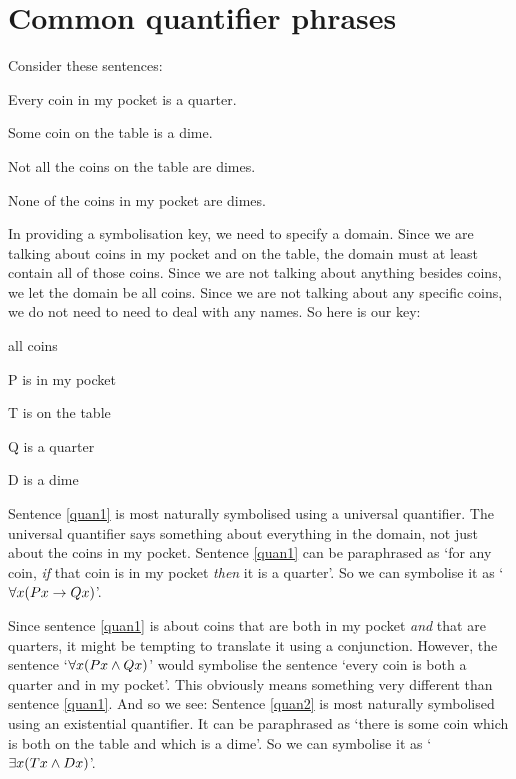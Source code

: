 \section{Common quantifier phrases}
Consider these sentences:
	\begin{earg}
		\item[\ex{quan1}] Every coin in my pocket is a quarter.
		\item[\ex{quan2}] Some coin on the table is a dime.
		\item[\ex{quan3}] Not all the coins on the table are dimes.
		\item[\ex{quan4}] None of the coins in my pocket are dimes.
	\end{earg}
In providing a symbolisation key, we need to specify a domain. Since we are talking about coins in my pocket and on the table, the domain must at least contain all of those coins. Since we are not talking about anything besides coins, we let the domain be all coins. Since we are not talking about any specific coins, we do not need to need to deal with any names. So here is our key:
	\begin{ekey}
		\item[\text{domain}] all coins
		\item[P\meta{x}]  is in my pocket
		\item[T\meta{x}]  is on the table
		\item[Q\meta{x}]  is a quarter
		\item[D\meta{x}]  is a dime
	\end{ekey}
Sentence \ref{quan1} is most naturally symbolised using a universal quantifier. The universal quantifier says something about everything in the domain, not just about the coins in my pocket. Sentence \ref{quan1} can be paraphrased as `for any coin, \emph{if} that coin is in my pocket \emph{then} it is a quarter'. So we can symbolise it as `$\forall x(Px \rightarrow Qx)$'.

Since sentence \ref{quan1} is about coins that are both in my pocket \emph{and} that are quarters, it might be tempting to translate it using a conjunction. However, the sentence `$\forall x(Px \wedge Qx)$' would symbolise the sentence `every coin is both a quarter and in my pocket'. This obviously means something very different than sentence \ref{quan1}. And so we see:
Sentence \ref{quan2} is most naturally symbolised using an existential quantifier. It can be paraphrased as `there is some coin which is both on the table and which is a dime'. So we can symbolise it as `$\exists x(Tx \wedge Dx)$'.

